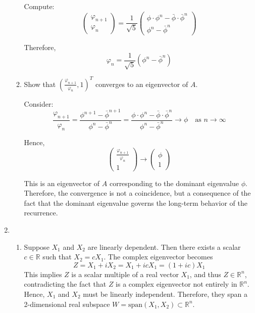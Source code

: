 \documentclass[12pt]{article}
\begin{document}
\begin{enumerate}
\begin{enumerate}
    Compute:
    \[
    \begin{pmatrix}
    \varphi_{n+1} \\
    \varphi_n
    \end{pmatrix}
    = \frac{1}{\sqrt{5}} \begin{pmatrix}
    \phi \cdot \phi^n - \bar{\phi} \cdot \bar{\phi}^n \\
    \phi^n - \bar{\phi}^n
    \end{pmatrix}
    \]

    Therefore,
    \[
    \varphi_n = \frac{1}{\sqrt{5}}(\phi^n - \bar{\phi}^n)
    \]

    \item Show that $\left( \frac{\varphi_{n+1}}{\varphi_n}, 1 \right)^T$ converges to an eigenvector of $A$.

    Consider:
    \[
    \frac{\varphi_{n+1}}{\varphi_n} = \frac{\phi^{n+1} - \bar{\phi}^{n+1}}{\phi^n - \bar{\phi}^n}
    = \frac{\phi \cdot \phi^n - \bar{\phi} \cdot \bar{\phi}^n}{\phi^n - \bar{\phi}^n}
    \to \phi
    \quad \text{as } n \to \infty
    \]

    Hence,
    \[
    \begin{pmatrix}
    \frac{\varphi_{n+1}}{\varphi_n} \\
    1
    \end{pmatrix}
    \to
    \begin{pmatrix}
    \phi \\
    1
    \end{pmatrix}
    \]

    This is an eigenvector of $A$ corresponding to the dominant eigenvalue $\phi$. Therefore, the convergence is not a coincidence, but a consequence of the fact that the dominant eigenvalue governs the long-term behavior of the recurrence.
\end{enumerate}

\item \begin{enumerate}
    \item 
    Suppose $X_1$ and $X_2$ are linearly dependent. Then there exists a scalar $c \in \mathbb{R}$ such that $X_2 = c X_1$. The complex eigenvector becomes
    \[
    Z = X_1 + i X_2 = X_1 + i c X_1 = (1 + i c) X_1
    \]
    This implies $Z$ is a scalar multiple of a real vector $X_1$, and thus $Z \in \mathbb{R}^n$, contradicting the fact that $Z$ is a complex eigenvector not entirely in $\mathbb{R}^n$. Hence, $X_1$ and $X_2$ must be linearly independent. Therefore, they span a 2-dimensional real subspace $W = \text{span}(X_1, X_2) \subset \mathbb{R}^n$.


\end{enumerate}
\end{enumerate}
\end{document}

